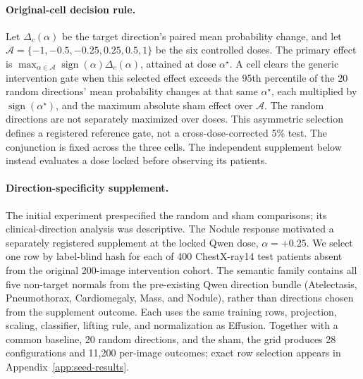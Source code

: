 \documentclass{article}
\begin{document}
\paragraph{Original-cell decision rule.}
Let $\Delta_c(\alpha)$ be the target direction's paired mean probability change, and let $\mathcal A=\{-1,-0.5,-0.25,0.25,0.5,1\}$ be the six controlled doses. The primary effect is $\max_{\alpha\in\mathcal A}\operatorname{sign}(\alpha)\Delta_c(\alpha)$, attained at dose $\alpha^\star$. A cell clears the generic intervention gate when this selected effect exceeds the 95th percentile of the 20 random directions' mean probability changes at that same $\alpha^\star$, each multiplied by $\operatorname{sign}(\alpha^\star)$, and the maximum absolute sham effect over $\mathcal A$. The random directions are not separately maximized over doses. This asymmetric selection defines a registered reference gate, not a cross-dose-corrected 5\% test. The conjunction is fixed across the three cells. The independent supplement below instead evaluates a dose locked before observing its patients.

\paragraph{Direction-specificity supplement.}
The initial experiment prespecified the random and sham comparisons; its clinical-direction analysis was descriptive. The Nodule response motivated a separately registered supplement at the locked Qwen dose, $\alpha=+0.25$. We select one row by label-blind hash for each of 400 ChestX-ray14 test patients absent from the original 200-image intervention cohort. The semantic family contains all five non-target normals from the pre-existing Qwen direction bundle (Atelectasis, Pneumothorax, Cardiomegaly, Mass, and Nodule), rather than directions chosen from the supplement outcome. Each uses the same training rows, projection, scaling, classifier, lifting rule, and normalization as Effusion. Together with a common baseline, 20 random directions, and the sham, the grid produces 28 configurations and 11,200 per-image outcomes; exact row selection appears in Appendix~\ref{app:seed-results}.
\end{document}
